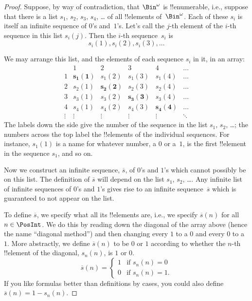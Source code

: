 \documentclass[../../../include/open-logic-section]{subfiles}
\begin{document}
\begin{proof}
Suppose, by way of contradiction, that $\Bin^\omega$ is
!!{enumerable}, i.e., suppose that there is a list $s_{1}$, $s_{2}$,
$s_{3}$, $s_{4}$, \dots{} of all !!{element}s of~$\Bin^\omega$.  Each
of these $s_i$ is itself an infinite sequence of $0$'s and~$1$'s.
Let's call the $j$-th element of the $i$-th sequence in this list
$s_i(j)$. Then the $i$-th sequence~$s_i$ is
\[
s_i(1), s_i(2), s_i(3), \dots
\]

We may arrange this list, and the elements of each sequence $s_i$ in
it, in an array:
\[
\begin{array}{c|c|c|c|c|c}
& 1 & 2 & 3 & 4 & \dots \\\hline
1 & \mathbf{s_{1}(1)} & s_{1}(2) & s_{1}(3) & s_1(4) & \dots \\\hline
2 & s_{2}(1)& \mathbf{s_{2}(2)} & s_2(3) & s_2(4) & \dots \\\hline
3 & s_{3}(1)& s_{3}(2) & \mathbf{s_3(3)} & s_3(4) & \dots \\\hline
4 & s_{4}(1)& s_{4}(2) & s_4(3) & \mathbf{s_4(4)} & \dots \\\hline
\vdots & \vdots & \vdots & \vdots & \vdots & \mathbf{\ddots}
\end{array}
\]
The labels down the side give the number of the sequence in the list
$s_1$, $s_2$, \dots; the numbers across the top label the !!{element}s
of the individual sequences. For instance, $s_{1}(1)$ is a name for
whatever number, a $0$ or a~$1$, is the first !!{element} in the
sequence $s_{1}$, and so on.

Now we construct an infinite sequence, $\overline{s}$, of $0$'s and
$1$'s which cannot possibly be on this list.  The definition of
$\overline{s}$ will depend on the list $s_1$, $s_2$, \dots.  Any
infinite list of infinite sequences of $0$'s and $1$'s gives rise to
an infinite sequence~$\overline{s}$ which is guaranteed to not appear
on the list.

To define $\overline{s}$, we specify what all its !!{element}s are,
i.e., we specify $\overline{s}(n)$ for all $n \in \PosInt$.  We do this
by reading down the diagonal of the array above (hence the name
``diagonal method'') and then changing every $1$ to a $0$ and every
$0$ to a~$1$. More abstractly, we define $\overline{s}(n)$ to be $0$
or $1$ according to whether the $n$-th !!{element} of the diagonal,
$s_n(n)$, is $1$ or $0$.
\[
\overline{s}(n) =
\begin{cases}
1 & \text{if $s_{n}(n) = 0$}\\
0 & \text{if $s_{n}(n) = 1$}.
\end{cases}
\]
If you like formulas better than definitions by cases, you could also
define $\overline{s}(n) = 1 - s_n(n)$.


\end{proof}
\end{document}
